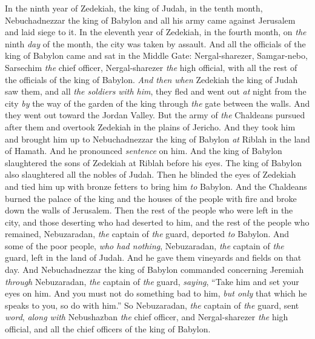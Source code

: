 \begin{biblechapter} %
 In the ninth year of Zedekiah, the king of Judah, in the tenth month, Nebuchadnezzar the king of Babylon and all his army came against Jerusalem and laid siege to it.
\verse In the eleventh year of Zedekiah, in the fourth month, on \textit{the} ninth \textit{day} of the month, the city was taken by assault.
\verse And all the officials of the king of Babylon came and sat in the Middle Gate: Nergal-sharezer, Samgar-nebo, Sarsechim \textit{the} chief officer, Nergal-sharezer \textit{the} high official, with all the rest of the officials of the king of Babylon.
\verse \textit{And then} \textit{when} Zedekiah the king of Judah saw them, and all \textit{the soldiers} \textit{with him}, they fled and went out \textit{at} night from the city \textit{by} the way of the garden of the king through \textit{the} gate between the walls. And they went out toward the Jordan Valley.
\verse But the army of \textit{the} Chaldeans pursued after them and overtook Zedekiah in the plains of Jericho. And they took him and brought him up to Nebuchadnezzar the king of Babylon \textit{at} Riblah in the land of Hamath. And he pronounced \textit{sentence} on him.
\verse And the king of Babylon slaughtered the sons of Zedekiah at Riblah before his eyes. The king of Babylon also slaughtered all the nobles of Judah.
\verse Then he blinded the eyes of Zedekiah and tied him up with bronze fetters to bring him \textit{to} Babylon.
\verse And the Chaldeans burned the palace of the king and the houses of the people with fire and broke down the walls of Jerusalem.
\verse Then the rest of the people who were left in the city, and those deserting who had deserted to him, and the rest of the people who remained, Nebuzaradan, \textit{the} captain of \textit{the} guard, deported \textit{to} Babylon.
\verse And some of the poor people, \textit{who had nothing}, Nebuzaradan, \textit{the} captain of \textit{the} guard, left in the land of Judah. And he gave them vineyards and fields on that day.
\verse And Nebuchadnezzar the king of Babylon commanded concerning Jeremiah \textit{through} Nebuzaradan, \textit{the} captain of \textit{the} guard, \textit{saying},
\verse “Take him and set your eyes on him. And you must not do something bad to him, \textit{but only} that which he speaks to you, so do with him.”
\verse So Nebuzaradan, \textit{the} captain of \textit{the} guard, sent \textit{word}, \textit{along with} Nebushazban \textit{the} chief officer, and Nergal-sharezer \textit{the} high official, and all the chief officers of the king of Babylon.

\end{biblechapter}
